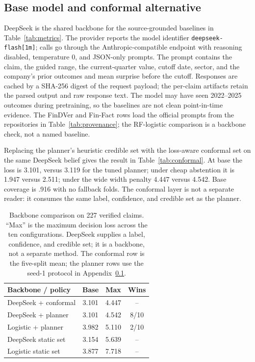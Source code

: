\documentclass[11pt]{article}
\begin{document}
\subsection{Base model and conformal alternative}
\label{app:deepseek}
DeepSeek is the shared backbone for the source-grounded baselines in
Table~\ref{tab:metrics}. The provider reports the model identifier
\texttt{deepseek-flash[1m]}; calls go through the Anthropic-compatible endpoint
with reasoning disabled, temperature 0, and JSON-only prompts. The prompt
contains the claim, the guided range, the current-quarter value, cutoff date,
sector, and the company's prior outcomes and mean surprise before the cutoff.
Responses are cached by a SHA-256 digest of the request payload; the per-claim
artifacts retain the parsed output and raw response text. The model may have
seen 2022--2025 outcomes during pretraining, so the baselines are not clean
point-in-time evidence. The FinDVer and Fin-Fact rows load the official prompts
from the repositories in Table~\ref{tab:provenance}; the RF-logistic comparison
is a backbone check, not a named baseline.

Replacing the planner's heuristic credible set with the loss-aware conformal
set on the same DeepSeek belief gives the result in
Table~\ref{tab:conformal}. At base the loss is 3.101, versus 3.119 for the
tuned planner; under cheap abstention it is 1.947 versus 2.511; under the wide
width penalty 4.447 versus 4.542. Base coverage is .916 with no fallback
folds. The conformal layer is not a separate reader: it consumes the same
label, confidence, and credible set as the planner.

\begin{table}[t]
\centering
\small
\setlength{\tabcolsep}{3pt}
\begin{tabular}{lccc}
\toprule
Backbone / policy & Base & Max & Wins \\
\midrule
DeepSeek + conformal & 3.101 & 4.447 & -- \\
DeepSeek + planner & 3.101 & 4.542 & 8/10 \\
Logistic + planner & 3.982 & 5.110 & 2/10 \\
DeepSeek static set & 3.154 & 5.639 & -- \\
Logistic static set & 3.877 & 7.718 & -- \\
\bottomrule
\end{tabular}
\caption{Backbone comparison on 227 verified claims. ``Max'' is the maximum
decision loss across the ten configurations. DeepSeek supplies a label,
confidence, and credible set; it is a backbone, not a separate method. The
conformal row is the five-split mean; the planner rows use the seed-1 protocol
in Appendix~\ref{app:deepseek}.}
\label{tab:backbone}
\end{table}
\end{document}
